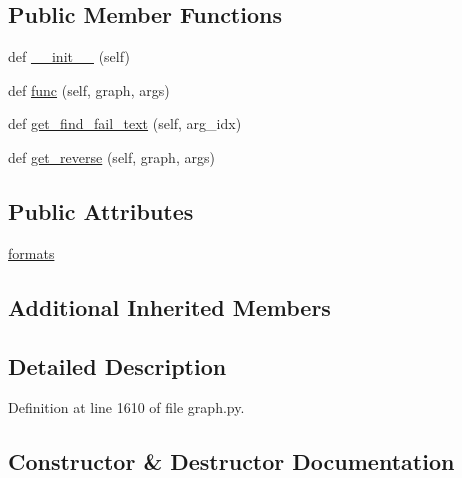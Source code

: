 \subsection*{Public Member Functions}
\begin{DoxyCompactItemize}
\item 
def \hyperlink{classlight__chats_1_1graph_1_1RemoveObjectFunction_a1ec221c7902c9aebb94137d84c1ee929}{\+\_\+\+\_\+init\+\_\+\+\_\+} (self)
\item 
def \hyperlink{classlight__chats_1_1graph_1_1RemoveObjectFunction_ae7b012e25908e96e2aaffcd567c0e133}{func} (self, graph, args)
\item 
def \hyperlink{classlight__chats_1_1graph_1_1RemoveObjectFunction_a28db384929d4d974a230d27546e23c6b}{get\+\_\+find\+\_\+fail\+\_\+text} (self, arg\+\_\+idx)
\item 
def \hyperlink{classlight__chats_1_1graph_1_1RemoveObjectFunction_a25e0182ea553e22cc861479aabd6a989}{get\+\_\+reverse} (self, graph, args)
\end{DoxyCompactItemize}
\subsection*{Public Attributes}
\begin{DoxyCompactItemize}
\item 
\hyperlink{classlight__chats_1_1graph_1_1RemoveObjectFunction_a67165948c1e8f963e79aac98baf91509}{formats}
\end{DoxyCompactItemize}
\subsection*{Additional Inherited Members}


\subsection{Detailed Description}
\begin{DoxyVerb}\end{DoxyVerb}
 

Definition at line 1610 of file graph.\+py.



\subsection{Constructor \& Destructor Documentation}
\mbox{\label{classlight__chats_1_1graph_1_1RemoveObjectFunction_a1ec221c7902c9aebb94137d84c1ee929}} 
